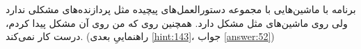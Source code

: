 \section{}
\paragraph{}\label{hint:9}
برنامه با ماشین‌هایی با مجموعه دستورالعمل‌های پیچیده مثل پردازنده‌های  مشکلی ندارد ولی روی ماشین‌های  مثل  مشکل دارد. همچنین روی  که من روی آن مشکل پیدا کردم، درست کار نمی‌کند. (راهنماییِ بعدی \ref{hint:143}، جواب \ref{answer:52})